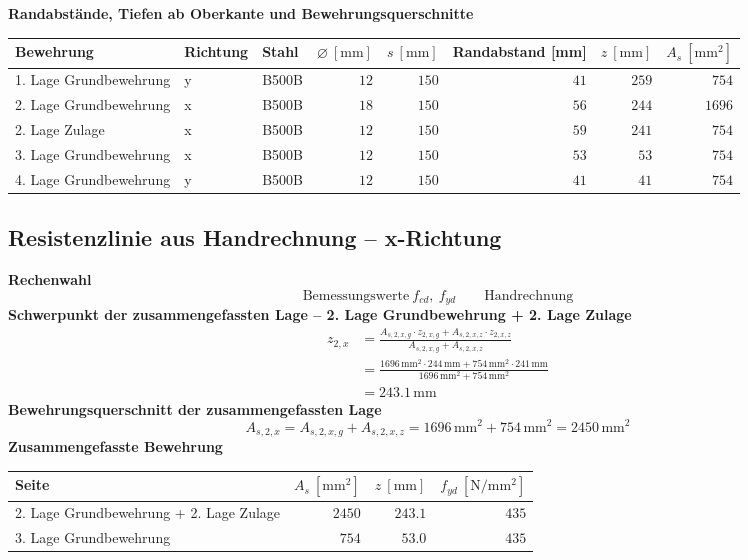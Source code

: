 \documentclass[11pt,a4paper]{article}
\begin{document}
\noindent\textbf{Randabstände, Tiefen ab Oberkante und Bewehrungsquerschnitte}
\begin{longtable}{lllrrrrr}
\hline
Bewehrung & Richtung & Stahl & $\varnothing\ [\mathrm{mm}]$ & $s\ [\mathrm{mm}]$ & Randabstand [mm] & $z\ [\mathrm{mm}]$ & $A_s\ [\mathrm{mm}^2]$ \\
\hline
\endhead
1. Lage Grundbewehrung & y & B500B & $12$ & $150$ & $41$ & $259$ & $754$ \\
2. Lage Grundbewehrung & x & B500B & $18$ & $150$ & $56$ & $244$ & $1696$ \\
2. Lage Zulage & x & B500B & $12$ & $150$ & $59$ & $241$ & $754$ \\
3. Lage Grundbewehrung & x & B500B & $12$ & $150$ & $53$ & $53$ & $754$ \\
4. Lage Grundbewehrung & y & B500B & $12$ & $150$ & $41$ & $41$ & $754$ \\
\hline
\end{longtable}
\subsection{Resistenzlinie aus Handrechnung – x-Richtung}
\noindent\textbf{Rechenwahl}
\begin{equation*}
\text{Bemessungswerte}\ f_{cd},\ f_{yd} \qquad \text{Handrechnung}
\end{equation*}
\noindent\textbf{Schwerpunkt der zusammengefassten Lage – 2. Lage Grundbewehrung + 2. Lage Zulage}
\begin{equation*}
\begin{aligned}
  z_{2,x} &= \frac{A_{s,2,x,g} \cdot z_{2,x,g} + A_{s,2,x,z} \cdot z_{2,x,z}}{A_{s,2,x,g} + A_{s,2,x,z}} \\
  &= \frac{1696\,\mathrm{mm}^{2} \cdot 244\,\mathrm{mm} + 754\,\mathrm{mm}^{2} \cdot 241\,\mathrm{mm}}{1696\,\mathrm{mm}^{2} + 754\,\mathrm{mm}^{2}} \\
  &= 243.1\,\mathrm{mm}
\end{aligned}
\end{equation*}
\noindent\textbf{Bewehrungsquerschnitt der zusammengefassten Lage}
\begin{equation*}
A_{s,2,x} = A_{s,2,x,g} + A_{s,2,x,z} = 1696\,\mathrm{mm}^{2} + 754\,\mathrm{mm}^{2} = 2450\,\mathrm{mm}^{2}
\end{equation*}
\noindent\textbf{Zusammengefasste Bewehrung}
\begin{longtable}{lrrr}
\hline
Seite & $A_s\ [\mathrm{mm}^2]$ & $z\ [\mathrm{mm}]$ & $f_{yd}\ [\mathrm{N/mm^2}]$ \\
\hline
\endhead
2. Lage Grundbewehrung + 2. Lage Zulage & $2450$ & $243.1$ & $435$ \\
3. Lage Grundbewehrung & $754$ & $53.0$ & $435$ \\
\hline
\end{longtable}
\end{document}
